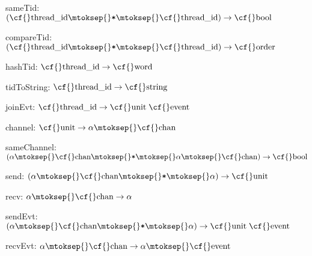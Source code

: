 \begin{interface}
\Nopagebreak
\item {}{} {\cf sameTid: \((\mbox{\cf{}thread\_id}\mtoksep{}\verb,*,\mtoksep{}\mbox{\cf{}thread\_id})\rightarrow \mbox{\cf{}bool}\)}

\Nopagebreak
\item {}{} {\cf compareTid: \((\mbox{\cf{}thread\_id}\mtoksep{}\verb,*,\mtoksep{}\mbox{\cf{}thread\_id})\rightarrow \mbox{\cf{}order}\)}

\Nopagebreak
\item {}{} {\cf hashTid: \(\mbox{\cf{}thread\_id}\rightarrow \mbox{\cf{}word}\)}

\Nopagebreak
\item {}{} {\cf tidToString: \(\mbox{\cf{}thread\_id}\rightarrow \mbox{\cf{}string}\)}

\Nopagebreak
\item {}{} {\cf joinEvt: \(\mbox{\cf{}thread\_id}\rightarrow \mbox{\cf{}unit}\;\mbox{\cf{}event}\)}

\Nopagebreak
\item {}{} {\cf channel: \(\mbox{\cf{}unit}\rightarrow \alpha\mtoksep{}\mbox{\cf{}chan}\)}

\Nopagebreak
\item {}{} {\cf sameChannel: \((\alpha\mtoksep{}\mbox{\cf{}chan}\mtoksep{}\verb,*,\mtoksep{}\alpha\mtoksep{}\mbox{\cf{}chan})\rightarrow \mbox{\cf{}bool}\)}

\Nopagebreak
\item {}{} {\cf send: \((\alpha\mtoksep{}\mbox{\cf{}chan}\mtoksep{}\verb,*,\mtoksep{}\alpha)\rightarrow \mbox{\cf{}unit}\)}

\Nopagebreak
\item {}{} {\cf recv: \(\alpha\mtoksep{}\mbox{\cf{}chan}\rightarrow \alpha\)}

\Nopagebreak
\item {}{} {\cf sendEvt: \((\alpha\mtoksep{}\mbox{\cf{}chan}\mtoksep{}\verb,*,\mtoksep{}\alpha)\rightarrow \mbox{\cf{}unit}\;\mbox{\cf{}event}\)}

\item {}{} {\cf recvEvt: \(\alpha\mtoksep{}\mbox{\cf{}chan}\rightarrow \alpha\mtoksep{}\mbox{\cf{}event}\)}


\end{interface}
